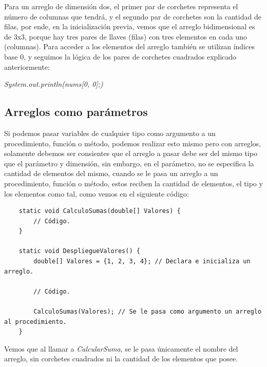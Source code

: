 Para un arreglo de dimensión dos, el primer par de corchetes representa el número de columnas que tendrá, y el segundo par de corchetes son la cantidad de filas, por ende, en la inicialización previa, vemos que el arreglo bidimensional es de 3x3, porque hay tres pares de llaves (filas) con tres elementos en cada uno (columnas).
Para acceder a los elementos del arreglo también se utilizan índices base 0, y seguimos la lógica de los pares de corchetes cuadrados explicado anteriormente:
\begin{center}
	\textit{System.out.println(nums[0, 0];)}
\end{center}


\subsection{Arreglos como parámetros}
\hspace{0.55cm}Si podemos pasar variables de cualquier tipo como argumento a un procedimiento, función o método, podemos realizar esto mismo pero con arreglos, solamente debemos ser consientes que el arreglo a pasar debe ser del mismo tipo que el parámetro y dimensión, sin embargo, en el parámetro, no se especifica la cantidad de elementos del mismo, cuando se le pasa un arreglo a un procedimiento, función o método, estos reciben la cantidad de elementos, el tipo y los elementos como tal, como vemos en el siguiente código:
\begin{lstlisting}
	static void CalculoSumas(double[] Valores) {
		// Código.
	}
	
	static void DespliegueValores() {
		double[] Valores = {1, 2, 3, 4}; // Declara e inicializa un arreglo.	
		
		// Código.
	
		CalculoSumas(Valores); // Se le pasa como argumento un arreglo al procedimiento.
	}
\end{lstlisting}

Vemos que al llamar a \textit{CalcularSuma}, se le pasa únicamente el nombre del arreglo, sin corchetes cuadrados ni la cantidad de los elementos que posee.